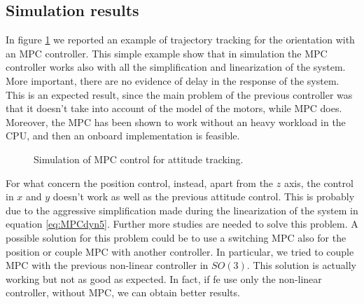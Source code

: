 \subsection{Simulation results}

\noindent In figure \ref{fig:MPC1} we reported an example of trajectory tracking for the orientation with an MPC controller. This simple example show that in simulation the MPC controller works also with all the simplification and linearization of the system. More important, there are no evidence of delay in the response of the system. This is an expected result, since the main problem of the previous controller was that it doesn't take into account of the model of the motors, while MPC does. Moreover, the MPC has been shown to work without an heavy workload in the CPU, and then an onboard implementation is feasible. 

\begin{figure}[h]
	\centering
	
	\caption{Simulation of MPC control for attitude tracking.}
	\label{fig:MPC1}		
\end{figure}

\noindent For what concern the position control, instead, apart from the $z$ axis, the control in $x$ and $y$ doesn't work as well as the previous attitude control. This is probably due to the aggressive simplification made during the linearization of the system in equation \eqref{eq:MPCdyn5}. Further more studies are needed to solve this problem. A possible solution for this problem could be to use a switching MPC also for the position or couple MPC with another controller. In particular, we tried to couple MPC with the previous non-linear controller in $SO(3)$. This solution is actually working but not as good as expected. In fact, if fe use only the non-linear controller, without MPC, we can obtain better results. 

